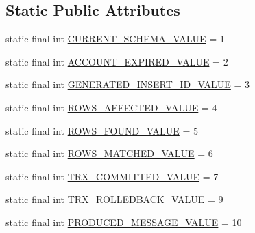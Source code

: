 \subsection*{Static Public Attributes}
\begin{DoxyCompactItemize}
\item 
static final int \mbox{\hyperlink{enumcom_1_1mysql_1_1cj_1_1x_1_1protobuf_1_1_mysqlx_notice_1_1_session_state_changed_1_1_parameter_acb81ce9279e602f2e70c0c15af6045bd}{C\+U\+R\+R\+E\+N\+T\+\_\+\+S\+C\+H\+E\+M\+A\+\_\+\+V\+A\+L\+UE}} = 1
\item 
static final int \mbox{\hyperlink{enumcom_1_1mysql_1_1cj_1_1x_1_1protobuf_1_1_mysqlx_notice_1_1_session_state_changed_1_1_parameter_ad37b098044bdb46918519f7fbd262972}{A\+C\+C\+O\+U\+N\+T\+\_\+\+E\+X\+P\+I\+R\+E\+D\+\_\+\+V\+A\+L\+UE}} = 2
\item 
static final int \mbox{\hyperlink{enumcom_1_1mysql_1_1cj_1_1x_1_1protobuf_1_1_mysqlx_notice_1_1_session_state_changed_1_1_parameter_ade62b51b759560c708e8eda565fb36bf}{G\+E\+N\+E\+R\+A\+T\+E\+D\+\_\+\+I\+N\+S\+E\+R\+T\+\_\+\+I\+D\+\_\+\+V\+A\+L\+UE}} = 3
\item 
static final int \mbox{\hyperlink{enumcom_1_1mysql_1_1cj_1_1x_1_1protobuf_1_1_mysqlx_notice_1_1_session_state_changed_1_1_parameter_a4c8ba6473bdd7eca03940f8865376464}{R\+O\+W\+S\+\_\+\+A\+F\+F\+E\+C\+T\+E\+D\+\_\+\+V\+A\+L\+UE}} = 4
\item 
static final int \mbox{\hyperlink{enumcom_1_1mysql_1_1cj_1_1x_1_1protobuf_1_1_mysqlx_notice_1_1_session_state_changed_1_1_parameter_a0e0196512323c019134adc8f7b3f2c72}{R\+O\+W\+S\+\_\+\+F\+O\+U\+N\+D\+\_\+\+V\+A\+L\+UE}} = 5
\item 
static final int \mbox{\hyperlink{enumcom_1_1mysql_1_1cj_1_1x_1_1protobuf_1_1_mysqlx_notice_1_1_session_state_changed_1_1_parameter_ae57d1ab7e3acd2ceace71312a2574412}{R\+O\+W\+S\+\_\+\+M\+A\+T\+C\+H\+E\+D\+\_\+\+V\+A\+L\+UE}} = 6
\item 
static final int \mbox{\hyperlink{enumcom_1_1mysql_1_1cj_1_1x_1_1protobuf_1_1_mysqlx_notice_1_1_session_state_changed_1_1_parameter_a24b4190e5908ca84a2c04fbaa293ecc3}{T\+R\+X\+\_\+\+C\+O\+M\+M\+I\+T\+T\+E\+D\+\_\+\+V\+A\+L\+UE}} = 7
\item 
static final int \mbox{\hyperlink{enumcom_1_1mysql_1_1cj_1_1x_1_1protobuf_1_1_mysqlx_notice_1_1_session_state_changed_1_1_parameter_a4d9f963fa65c82f9ec90a26febf17f5e}{T\+R\+X\+\_\+\+R\+O\+L\+L\+E\+D\+B\+A\+C\+K\+\_\+\+V\+A\+L\+UE}} = 9
\item 
static final int \mbox{\hyperlink{enumcom_1_1mysql_1_1cj_1_1x_1_1protobuf_1_1_mysqlx_notice_1_1_session_state_changed_1_1_parameter_a1d226cbdaecf5472e55cc04d4144510b}{P\+R\+O\+D\+U\+C\+E\+D\+\_\+\+M\+E\+S\+S\+A\+G\+E\+\_\+\+V\+A\+L\+UE}} = 10

\end{DoxyCompactItemize}
